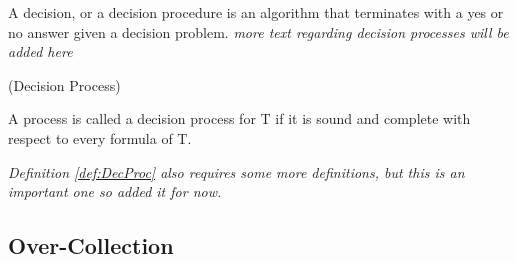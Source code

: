 A decision, or a decision procedure is an algorithm that terminates with a yes or no answer given a decision problem.\cite{decisionproceduresbook} \textit{more text regarding decision processes will be added here}

\begin{definition}{}{}
\label{def:DecProc}
(Decision Process)

A process is called a decision process for T if it is sound and complete with respect to every formula of T.
\end{definition}

\textit{Definition \ref{def:DecProc} also requires some more definitions, but this is an important one so added it for now.}




\subsection{Over-Collection}


